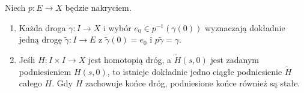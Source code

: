\begin{twierdzenie}
\label{thm:podnoszenie-nakrycie}
Niech $p:E\to X$ będzie nakryciem.
\begin{enumerate}[label=(\alph*),leftmargin=*]
\item Każda droga $\gamma:I\to X$ i wybór
      $e_0\in p^{-1}(\gamma(0))$ wyznaczają
      dokładnie jedną drogę
      $\widetilde\gamma:I\to E$ z
      $\widetilde\gamma(0)=e_0$ i
      $p\widetilde\gamma=\gamma$.
\item Jeśli $H:I\times I\to X$ jest
      homotopią dróg, a $\widetilde H(s,0)$
      jest zadanym podniesieniem $H(s,0)$,
      to istnieje dokładnie jedno ciągłe
      podniesienie $\widetilde H$ całego $H$.
      Gdy $H$ zachowuje końce dróg,
      podniesione końce również są stałe.
\end{enumerate}
\end{twierdzenie}
